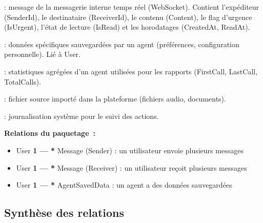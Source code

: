 \begin{description}[itemsep=4pt]
    \item[\textbf{Message}] : message de la messagerie interne temps réel (WebSocket).
    Contient l'expéditeur (SenderId), le destinataire (ReceiverId), le contenu
    (Content), le flag d'urgence (IsUrgent), l'état de lecture (IsRead) et les
    horodatages (CreatedAt, ReadAt).

    \item[\textbf{AgentSavedData}] : données spécifiques sauvegardées par un agent
    (préférences, configuration personnelle). Lié à User.

    \item[\textbf{Agent}] : statistiques agrégées d'un agent utilisées pour les
    rapports (FirstCall, LastCall, TotalCalls).

    \item[\textbf{SourceFile}] : fichier source importé dans la plateforme
    (fichiers audio, documents).

    \item[\textbf{Log}] : journalisation système pour le suivi des actions.
\end{description}

\textbf{Relations du paquetage~:}
\begin{itemize}
    \item User \textbf{1 --- *} Message (Sender) : un utilisateur envoie plusieurs messages
    \item User \textbf{1 --- *} Message (Receiver) : un utilisateur reçoit plusieurs messages
    \item User \textbf{1 --- *} AgentSavedData : un agent a des données sauvegardées
\end{itemize}

\subsection{Synthèse des relations}


